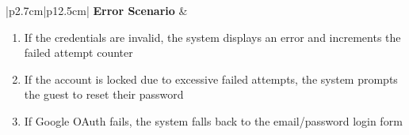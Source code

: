\begin{table}[H]
\begin{tabular}{|p{2.7cm}|p{12.5cm}|}
        \hline
        \textbf{Error Scenario} & \begin{minipage}[t]{\linewidth}
                                      \begin{enumerate}[topsep=0pt,itemsep=1pt,parsep=0pt,partopsep=0pt]
                                          \item If the credentials are invalid, the system displays an error and increments the
                                                failed attempt counter
                                          \item If the account is locked due to excessive failed attempts, the system prompts
                                                the guest to reset their password
                                          \item If Google OAuth fails, the system falls back to the email/password login form
                                      \end{enumerate}
                                  \end{minipage} \\
        \hline
    \end{tabular}
    \label{tab:guest-login}
\end{table}
